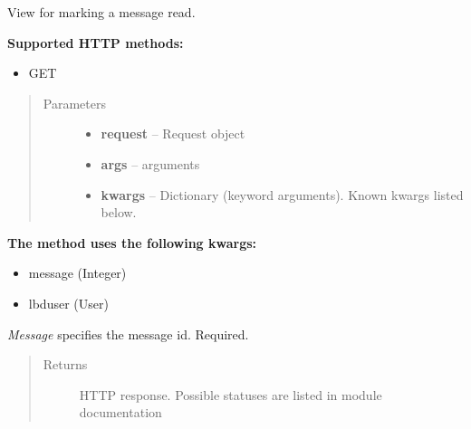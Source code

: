 \documentclass[letterpaper,10pt,english]{sphinxmanual}
\begin{document}
\begin{fulllineitems}
\label{codedoc/msgdoc:lbd_backend.LBD_REST_messagedata.views.mark_as_read}
View for marking a message read.

\textbf{Supported HTTP methods:}
\begin{itemize}
\item {} 
GET

\end{itemize}
\begin{quote}\begin{description}
\item[{Parameters}] \leavevmode\begin{itemize}
\item {} 
\textbf{request} -- Request object

\item {} 
\textbf{args} -- arguments

\item {} 
\textbf{kwargs} -- Dictionary (keyword arguments). Known kwargs listed below.

\end{itemize}

\end{description}\end{quote}

\textbf{The method uses the following kwargs:}
\begin{itemize}
\item {} 
message (Integer)

\item {} 
lbduser (User)

\end{itemize}

\emph{Message} specifies the message id. Required.
\begin{quote}\begin{description}
\item[{Returns}] \leavevmode
HTTP response. Possible statuses are listed in module documentation

\end{description}\end{quote}

\end{fulllineitems}

\end{document}
